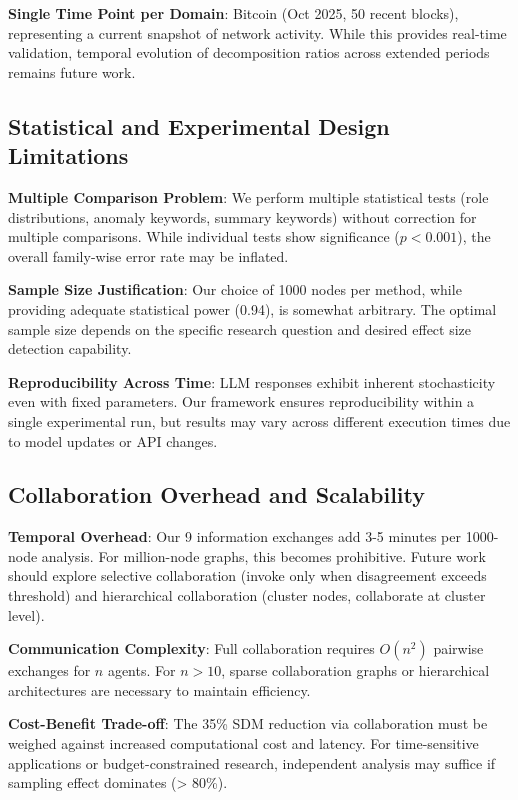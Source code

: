 \documentclass[conference]{IEEEtran}
\begin{document}
\textbf{Single Time Point per Domain}: Bitcoin (Oct 2025, 50 recent blocks), representing a current snapshot of network activity. While this provides real-time validation, temporal evolution of decomposition ratios across extended periods remains future work.

\subsection{Statistical and Experimental Design Limitations}

\textbf{Multiple Comparison Problem}: We perform multiple statistical tests (role distributions, anomaly keywords, summary keywords) without correction for multiple comparisons. While individual tests show significance ($p < 0.001$), the overall family-wise error rate may be inflated.

\textbf{Sample Size Justification}: Our choice of 1000 nodes per method, while providing adequate statistical power (0.94), is somewhat arbitrary. The optimal sample size depends on the specific research question and desired effect size detection capability.

\textbf{Reproducibility Across Time}: LLM responses exhibit inherent stochasticity even with fixed parameters. Our framework ensures reproducibility within a single experimental run, but results may vary across different execution times due to model updates or API changes.

\subsection{Collaboration Overhead and Scalability}

\textbf{Temporal Overhead}: Our 9 information exchanges add 3-5 minutes per 1000-node analysis. For million-node graphs, this becomes prohibitive. Future work should explore selective collaboration (invoke only when disagreement exceeds threshold) and hierarchical collaboration (cluster nodes, collaborate at cluster level).

\textbf{Communication Complexity}: Full collaboration requires $O(n^2)$ pairwise exchanges for $n$ agents. For $n > 10$, sparse collaboration graphs or hierarchical architectures are necessary to maintain efficiency.

\textbf{Cost-Benefit Trade-off}: The 35\% SDM reduction via collaboration must be weighed against increased computational cost and latency. For time-sensitive applications or budget-constrained research, independent analysis may suffice if sampling effect dominates (> 80\%).
\end{document}
